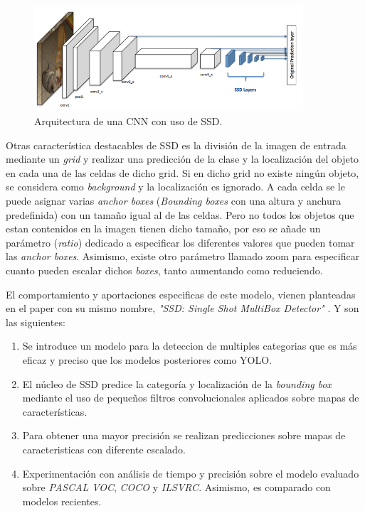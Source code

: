 \begin{figure}[htp]
	\centering
	\includegraphics[width=10cm]{imagenes/cnnssd.png}
	\caption{Arquitectura de una CNN con uso de SSD.}
	\label{fig:ssd}
\end{figure}

Otras característica destacables de SSD es la división de la imagen de entrada mediante un \textit{grid} y realizar una predicción de la clase y la localización del objeto en cada una de las celdas de dicho grid. Si en dicho grid no existe ningún objeto, se considera como \textit{background} y la localización es ignorado. A cada celda se le puede asignar varias \textit{anchor boxes} (\textit{Bounding boxes} con una altura y anchura predefinida) con un tamaño igual al de las celdas. Pero no todos los objetos que estan contenidos en la imagen tienen dicho tamaño, por eso se añade un parámetro (\textit{ratio}) dedicado a especificar los diferentes valores que pueden tomar las \textit{anchor boxes}. Asimismo, existe otro parámetro llamado zoom para especificar cuanto pueden escalar dichos \textit{boxes}, tanto aumentando como reduciendo.\cite{ssdwork}

El comportamiento y aportaciones especificas de este modelo, vienen planteadas en el paper con su mismo nombre, \textit{"SSD: Single Shot MultiBox Detector"} \cite{ssd}. Y son las siguientes:

\begin{enumerate}
	\item Se introduce un modelo para la deteccion de multiples categorias que es más eficaz y preciso que los modelos posteriores como YOLO.
	\item El núcleo de SSD predice la categoría y localización de la \textit{bounding box} mediante el uso de pequeños filtros convolucionales aplicados sobre mapas de características.
	\item Para obtener una mayor precisión se realizan predicciones sobre mapas de caracteristicas con diferente escalado.
	\item Experimentación con análisis de tiempo y precisión sobre el modelo evaluado sobre \textit{PASCAL VOC}, \textit{COCO} y \textit{ILSVRC}. Asimismo, es comparado con modelos recientes.
\end{enumerate}

